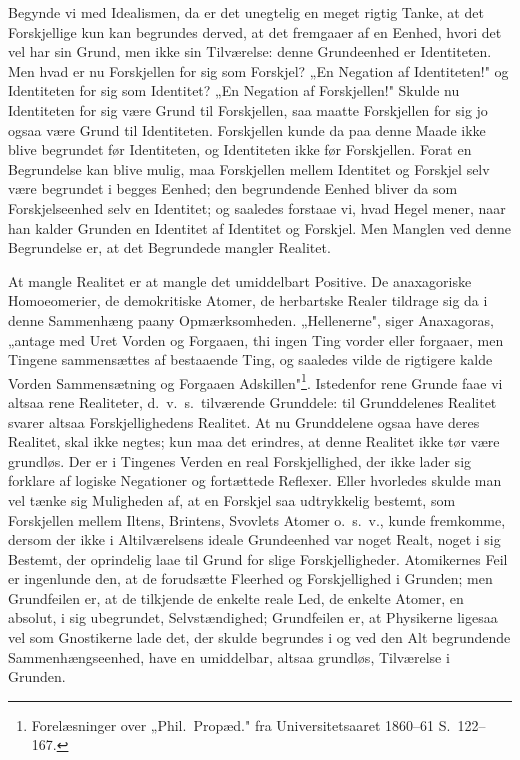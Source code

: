 \documentclass[12pt]{book}
\newcommand{\opage}[1]{\marginnote{\footnotesize\textit{[#1]}}}
\begin{document}
Begynde vi med Idealismen, da er det unegtelig en meget rigtig Tanke, at det
Forskjellige kun kan begrundes derved, at det fremgaaer af en Eenhed, hvori det vel
har sin Grund, men ikke sin Tilværelse: denne Grundeenhed er Identiteten. Men hvad er
nu Forskjellen for sig som Forskjel? „En Negation af Identiteten!" og Identiteten for
sig som Identitet? „En Negation af Forskjellen!" Skulde nu Identiteten for sig være
Grund til Forskjellen, saa maatte Forskjellen for sig jo ogsaa være Grund til
Identiteten. Forskjellen kunde da paa denne Maade ikke blive begrundet før
Identiteten, og Identiteten ikke før Forskjellen. Forat en Begrundelse kan blive
mulig, maa Forskjellen mellem Identitet og Forskjel selv være begrundet i begges
Eenhed; den begrundende Eenhed bliver da som Forskjelseenhed selv en Identitet; og
saaledes forstaae vi, hvad Hegel mener, naar han kalder Grunden en Identitet af
Identitet og Forskjel.
\opage{97} Men Manglen ved denne Begrundelse er, at det Begrundede mangler Realitet.

At mangle Realitet er at mangle det umiddelbart Positive. De anaxagoriske
Homoeomerier, de demokritiske Atomer, de herbartske Realer tildrage sig da i denne
Sammenhæng paany Opmærksomheden. „Hellenerne", siger Anaxagoras, „antage med Uret
Vorden og Forgaaen, thi ingen Ting vorder eller forgaaer, men Tingene sammensættes af
bestaaende Ting, og saaledes vilde de rigtigere kalde Vorden Sammensætning og Forgaaen
Adskillen"\footnote{Forelæsninger over „Phil.\ Propæd." fra Universitetsaaret
1860--61 S.~122--167.}. Istedenfor rene Grunde faae vi altsaa rene Realiteter, d.\
v.\ s.\ tilværende Grunddele: til Grunddelenes Realitet svarer altsaa Forskjellighedens
Realitet. At nu Grunddelene ogsaa have deres Realitet, skal ikke negtes; kun maa det
erindres, at denne Realitet ikke tør være grundløs. Der er i Tingenes Verden en real
Forskjellighed, der ikke lader sig forklare af logiske Negationer og fortættede
Reflexer. Eller hvorledes skulde man vel tænke sig Muligheden af, at en Forskjel saa
udtrykkelig bestemt, som Forskjellen mellem Iltens, Brintens, Svovlets Atomer o.\ s.\
v., kunde fremkomme, dersom der ikke i Altilværelsens ideale Grundeenhed var noget
Realt, noget i sig Bestemt, der oprindelig laae til Grund for slige Forskjelligheder.
Atomikernes Feil er ingenlunde den, at de forudsætte Fleerhed og Forskjellighed i
Grunden; men Grundfeilen er, at de tilkjende de enkelte reale Led, de enkelte Atomer,
en absolut, i sig ubegrundet, Selvstændighed; Grundfeilen er, at Physikerne ligesaa
vel som Gnostikerne lade det, der skulde begrundes i og ved den Alt begrundende
Sammenhængseenhed, have en umiddelbar, altsaa grundløs, Tilværelse i Grunden.
\end{document}
